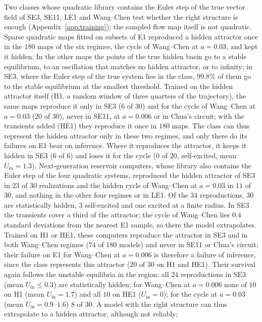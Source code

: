 \documentclass[aip,cha,reprint,amsmath,amssymb,longbibliography]{revtex4-2}
\theoremstyle{definition}
\newcommand{\Uin}{U_{\mathrm{in}}}
\begin{document}
Two classes whose quadratic library contains the Euler step of the true vector field of SE3, SE11, LE1 and Wang--Chen test
whether the right structure is enough (Appendix~\ref{app:training}); the sampled flow map itself is not quadratic. Sparse
quadratic maps fitted on subsets of E1 reproduced a hidden attractor once in the $180$ maps of the six regimes, the cycle
of Wang--Chen at $a=0.03$, and kept it hidden. In the other maps the points of the true hidden basin go to a
stable equilibrium, to an oscillation that matches no hidden attractor, or to infinity; in SE3, where the Euler step of the
true system lies in the class, $99.8\%$ of them go to the stable equilibrium at the smallest threshold. Trained on the
hidden attractor itself (H1, a random window of three quarters of the trajectory), the same maps reproduce it only in SE3
($6$ of $30$) and for the cycle of Wang--Chen at $a=0.03$ ($20$ of $30$), never in SE11, at $a=0.006$ or in Chua's circuit;
with the transients added (HE1) they reproduce it once in $180$ maps. The class can thus represent the hidden attractor
only in these two regimes, and only there do its failures on E1 bear on inference. Where it reproduces the attractor, it
keeps it hidden in SE3 ($6$ of $6$) and loses it for the cycle ($0$ of $20$, self-excited, mean $\Uin=1.3$).
Next-generation reservoir computers, whose library also contains the Euler step of the four quadratic systems,
reproduced the hidden attractor of SE3 in $23$ of $30$ realizations and the hidden cycle of Wang--Chen at $a=0.03$ in $11$
of $30$, and nothing in the other four regimes or in LE1. Of the $34$ reproductions, $30$ are statistically hidden, $3$ self-excited
and one excited at a finite radius. In SE3 the transients cover a third of the attractor; the cycle of Wang--Chen lies
$0.4$ standard deviations from the nearest E1 sample, so there the model extrapolates. Trained on H1 or HE1, these
computers reproduce the attractor in SE3 and in both Wang--Chen regimes ($74$ of $180$ models) and never in SE11 or Chua's
circuit; their failure on E1 for Wang--Chen at $a=0.006$ is therefore a failure of inference, since the class represents
this attractor ($20$ of $30$ on H1 and HE1). Their survival again follows the unstable equilibria in the region: all $24$
reproductions in SE3 (mean $\Uin\le0.3$) are statistically hidden; for Wang--Chen at $a=0.006$ none of $10$ on H1 (mean
$\Uin=1.7$) and all $10$ on HE1 ($\Uin=0$); for the cycle at $a=0.03$ (mean $\Uin=0.9$--$1.6$) $8$ of $30$. A model with the right structure can thus extrapolate to a hidden attractor, although not reliably;
\end{document}
